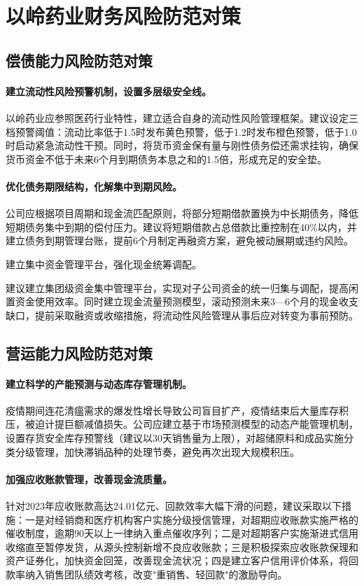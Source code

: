 \documentclass[12pt,a4paper,fontset=windows,UTF8]{ctexart}
\begin{document}
\section{以岭药业财务风险防范对策}
\subsection{偿债能力风险防范对策}
\paragraph*{建立流动性风险预警机制，设置多层级安全线。}
以岭药业应参照医药行业特性，建立适合自身的流动性风险管理框架。建议设定三档预警阈值：流动比率低于1.5时发布黄色预警，低于1.2时发布橙色预警，低于1.0时启动紧急流动性干预。同时，将货币资金保有量与刚性债务偿还需求挂钩，确保货币资金不低于未来6个月到期债务本息之和的1.5倍，形成充足的安全垫。

\paragraph*{优化债务期限结构，化解集中到期风险。}
公司应根据项目周期和现金流匹配原则，将部分短期借款置换为中长期债务，降低短期债务集中到期的偿付压力。建议将短期借款占总借款比重控制在40\%以内，并建立债务到期管理台账，提前6个月制定再融资方案，避免被动展期或违约风险。

建立集中资金管理平台，强化现金统筹调配。

建议建立集团级资金集中管理平台，实现对子公司资金的统一归集与调配，提高闲置资金使用效率。同时建立现金流量预测模型，滚动预测未来3—6个月的现金收支缺口，提前采取融资或收缩措施，将流动性风险管理从事后应对转变为事前预防。

\subsection{营运能力风险防范对策}
\paragraph*{建立科学的产能预测与动态库存管理机制。}
疫情期间连花清瘟需求的爆发性增长导致公司盲目扩产，疫情结束后大量库存积压，被迫计提巨额减值损失。公司应建立基于市场预测模型的动态产能管理机制，设置存货安全库存预警线（建议以30天销售量为上限），对超储原料和成品实施分类分级管理，加快滞销品种的处理节奏，避免再次出现大规模积压。

\paragraph*{加强应收账款管理，改善现金流质量。}
针对2023年应收账款高达24.01亿元、回款效率大幅下滑的问题，建议采取以下措施：一是对经销商和医疗机构客户实施分级授信管理，对超期应收账款实施严格的催收制度，逾期90天以上一律纳入重点催收序列；二是对超期客户实施渐进式信用收缩直至暂停发货，从源头控制新增不良应收账款；三是积极探索应收账款保理和资产证券化，加快资金回笼，改善现金流状况；四是建立客户信用评价体系，将回款率纳入销售团队绩效考核，改变"重销售、轻回款"的激励导向。
\end{document}
